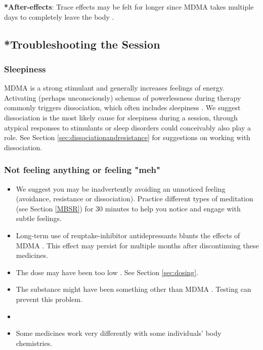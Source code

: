 \documentclass[12pt,letterpaper]{article}
\begin{document}
\textbf{*After-effects}:
Trace effects may be felt for longer since MDMA takes multiple days to completely leave the body \cite{torrePharmacology}.

\subsection{*Troubleshooting the Session}
\label{sec:troubleshooting}
\subsubsection{Sleepiness}
MDMA is a strong stimulant and generally increases feelings of energy. Activating (perhaps unconsciously) schemas of powerlessness during therapy commonly triggers dissociation, which often includes sleepiness \cite{kozlowskaDefenseCascade}. We suggest dissociation is the most likely cause for sleepiness during a session, through atypical responses to stimulants or sleep disorders could conceivably also play a role. See Section \ref{sec:dissociationandresistance} for suggestions on working with dissociation.
\subsubsection{Not feeling anything or feeling "meh"}
\begin{itemize}
    \item We suggest you may be inadvertently avoiding an unnoticed feeling (avoidance, resistance or dissociation). Practice different types of meditation (see Section \ref{MBSR}) for 30 minutes to help you notice and engage with subtle feelings.
    \item Long-term use of reuptake-inhibitor antidepressants blunts the effects of MDMA \cite{feducciaSSRIDiscontinuation}. This effect may persist for multiple months after discontinuing these medicines.
    \item The dose may have been too low \cite{bediMDMALowDose}. See Section \ref{sec:dosing}.
    \item The substance might have been something other than MDMA \cite{saleemiAdulterants}. Testing can prevent this problem.
    \item {}
    \item Some medicines work very differently with some individuals' body chemistries.
\end{itemize}
\end{document}
